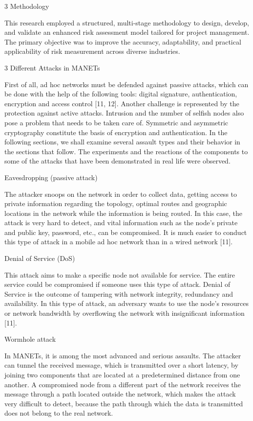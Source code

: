 \documentclass[10pt]{NSP1}
\begin{document}
3 Methodology

This research employed a structured, multi-stage methodology to design, develop, and validate an enhanced risk assessment model tailored for project management. The primary objective was to improve the accuracy, adaptability, and practical applicability of risk measurement across diverse industries.

3 Different Attacks in MANETs

First of all, ad hoc networks must be defended against passive attacks, which can be done with the help of the following tools: digital signature, authentication, encryption and access control [11, 12]. Another challenge is represented by the protection against active attacks. Intrusion and the number of selfish nodes also pose a problem that needs to be taken care of. Symmetric and asymmetric cryptography constitute the basis of encryption and authentication. In the following sections, we shall examine several assault types and their behavior in the sections that follow. The experiments and the reactions of the components to some of the attacks that have been demonstrated in real life were observed.

Eavesdropping (passive attack)

The attacker snoops on the network in order to collect data, getting access to private information regarding the topology, optimal routes and geographic locations in the network while the information is being routed. In this case, the attack is very hard to detect, and vital information such as the node’s private and public key, password, etc., can be compromised. It is much easier to conduct this type of attack in a mobile ad hoc network than in a wired network [11].

Denial of Service (DoS)

This attack aims to make a specific node not available for service. The entire service could be compromised if someone uses this type of attack. Denial of Service is the outcome of tampering with network integrity, redundancy and availability. In this type of attack, an adversary wants to use the node's resources or network bandwidth by overflowing the network with insignificant information [11].

Wormhole attack

In MANETs, it is among the most advanced and serious assaults. The attacker can tunnel the received message, which is transmitted over a short latency, by joining two components that are located at a predetermined distance from one another. A compromised node from a different part of the network receives the message through a path located outside the network, which makes the attack very difficult to detect, because the path through which the data is transmitted does not belong to the real network.
\end{document}
